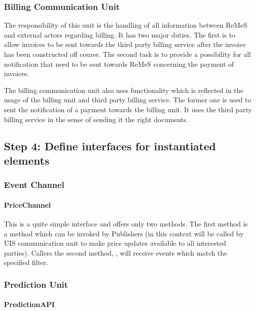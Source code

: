 \subsubsection{Billing Communication Unit}

\npar The responsibility of this unit is the handling of all information between
ReMeS and external actors regarding billing. It has two major duties. The first
is to allow invoices to be sent towards the third party billing service after
the invoice has been constructed off course. The second task is to provide a
possibility for all notification that need to be sent towards ReMeS concerning
the payment of invoices.

\npar The billing communication unit also uses functionality which is reflected
in the usage of the billing unit and third party billing service. The former one
is used to sent the notification of a payment towards the billing unit. It uses
the third party billing service in the sense of sending it the right documents.

\subsection{Step 4: Define interfaces for instantiated elements}
\label{add:it10/interfaces}

\subsubsection{Event Channel}

\paragraph{PriceChannel}
\npar This is a quite simple interface and offers only two methods. The first
method is a  method which can be invoked by
Publishers (in this context  will be called by UIS communication
unit to make price updates available to all interested parties). Callers the
second method, , will receive events which
match the specified filter.

\subsubsection{Prediction Unit}

\paragraph{PredictionAPI}

